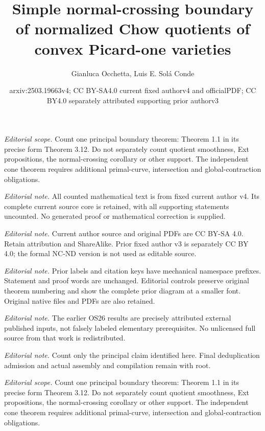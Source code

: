 \documentclass[10pt,a4paper]{article}
\title{Simple normal-crossing boundary of normalized Chow quotients of convex Picard-one varieties}
\author{Gianluca Occhetta, Luis E. Solá Conde}
\date{arxiv:2503.19663v4; CC BY-SA4.0 current fixed authorv4 and officialPDF; CC BY4.0 separately attributed supporting prior authorv3}
\numberwithin{equation}{section}
\theoremstyle{definition}
\theoremstyle{remark}
\begin{document}
\maketitle
\setcounter{section}{1}
\setcounter{theorem}{0}
\noindent\textit{Editorial scope.} Count one principal boundary theorem: Theorem 1.1 in its precise form Theorem 3.12. Do not separately count quotient smoothness, Ext propositions, the normal-crossing corollary or other support. The independent cone theorem requires additional primal-curve, intersection and global-contraction obligations.\par\medskip
\noindent\textit{Editorial note.} All counted mathematical text is from fixed current author v4. Its complete current source core is retained, with all supporting statements uncounted. No generated proof or mathematical correction is supplied.\par\medskip
\noindent\textit{Editorial note.} Current author source and original PDFs are CC BY-SA 4.0. Retain attribution and ShareAlike. Prior fixed author v3 is separately CC BY 4.0; the formal NC-ND version is not used as editable source.\par\medskip
\noindent\textit{Editorial note.} Prior labels and citation keys have mechanical namespace prefixes. Statement and proof words are unchanged. Editorial controls preserve original theorem numbering and show the complete prior diagram at a smaller font. Original native files and PDFs are also retained.\par\medskip
\noindent\textit{Editorial note.} The earlier OS26 results are precisely attributed external published inputs, not falsely labeled elementary prerequisites. No unlicensed full source from that work is redistributed.\par\medskip
\noindent\textit{Editorial note.} Count only the principal claim identified here. Final deduplication admission and actual assembly and compilation remain with root.\par\medskip
\noindent\textit{Editorial scope.} Count one principal boundary theorem: Theorem 1.1 in its precise form Theorem 3.12. Do not separately count quotient smoothness, Ext propositions, the normal-crossing corollary or other support. The independent cone theorem requires additional primal-curve, intersection and global-contraction obligations.\par\medskip
\end{document}
